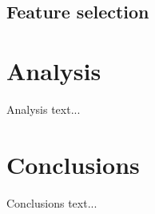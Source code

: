\subsection{Feature selection}
\todo{}

\section{Analysis}
Analysis text...

\section{Conclusions}
Conclusions text...